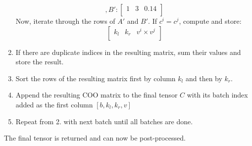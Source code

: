 \begin{enumerate}[label*=\arabic*.]
\begin{equation*}
              , B':
              \begin{bmatrix}
                  1 & 3 & 0.14 \\
              \end{bmatrix}
          \end{equation*}
          Now, iterate through the rows of $A'$ and $B'$. If $c^i = c^j$, compute and store:
          \begin{equation*}
              \begin{bmatrix}
                  k_l & k_r & v^i \times v^j \\
              \end{bmatrix}
          \end{equation*}
    \item If there are duplicate indices in the resulting matrix, sum their values and store the result.
    \item Sort the rows of the resulting matrix first by column $k_l$ and then by $k_r$.
    \item Append the resulting COO matrix to the final tensor $C$ with its batch index added as the
          first column $[b, k_l, k_r, v]$
    \item Repeat from 2. with next batch until all batches are done.
\end{enumerate}
The final tensor is returned and can now be post-processed.

